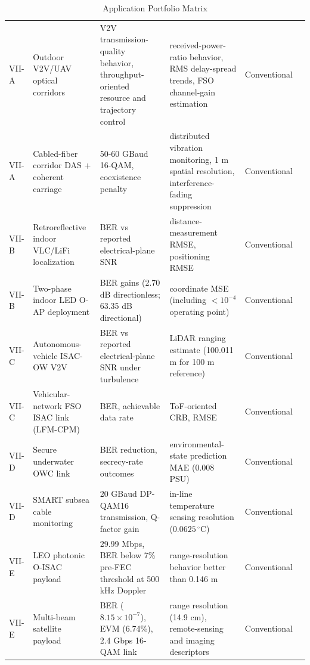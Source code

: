 \begin{table}[htbp]
\caption{Application Portfolio Matrix}
\label{tab:section7_portfolio}
\centering
\setlength{\tabcolsep}{3pt}
\renewcommand{\arraystretch}{1.12}
\begin{tabularx}{\textwidth}{@{}L{1.4cm}Y Y Y L{1.8cm}L{2.0cm}@{}}
\toprule
{} &  &  &  &  &  \\
\midrule
VII-A & Outdoor V2V/UAV optical corridors & V2V transmission-quality behavior, throughput-oriented resource and trajectory control & received-power-ratio behavior, RMS delay-spread trends, FSO channel-gain estimation & Conventional & \cite{O_ISAC_003,O_ISAC_005} \\
VII-A & Cabled-fiber corridor DAS + coherent carriage & 50-60 GBaud 16-QAM, coexistence penalty & distributed vibration monitoring, 1 m spatial resolution, interference-fading suppression & Conventional & \cite{O_ISAC_038,O_ISAC_074} \\
VII-B & Retroreflective indoor VLC/LiFi localization & BER vs reported electrical-plane SNR & distance-measurement RMSE, positioning RMSE & Conventional & \cite{O_ISAC_011} \\
VII-B & Two-phase indoor LED O-AP deployment & BER gains (2.70 dB directionless; 63.35 dB directional) & coordinate MSE (including $<10^{-4}$ operating point) & Conventional & \cite{O_ISAC_108} \\
VII-C & Autonomous-vehicle ISAC-OW V2V & BER vs reported electrical-plane SNR under turbulence & LiDAR ranging estimate (100.011 m for 100 m reference) & Conventional & \cite{O_ISAC_060} \\
VII-C & Vehicular-network FSO ISAC link (LFM-CPM) & BER, achievable data rate & ToF-oriented CRB, RMSE & Conventional & \cite{O_ISAC_055} \\
VII-D & Secure underwater OWC link & BER reduction, secrecy-rate outcomes & environmental-state prediction MAE (0.008 PSU) & Conventional & \cite{O_ISAC_127} \\
VII-D & SMART subsea cable monitoring & 20 GBaud DP-QAM16 transmission, Q-factor gain & in-line temperature sensing resolution ($0.0625\,^{\circ}\mathrm{C}$) & Conventional & \cite{O_ISAC_220} \\
VII-E & LEO photonic O-ISAC payload & 29.99 Mbps, BER below 7\% pre-FEC threshold at 500 kHz Doppler & range-resolution behavior better than 0.146 m & Conventional & \cite{O_ISAC_187} \\
VII-E & Multi-beam satellite payload & BER ($8.15 \times 10^{-7}$), EVM (6.74\%), 2.4 Gbps 16-QAM link & range resolution (14.9 cm), remote-sensing and imaging descriptors & Conventional & \cite{O_ISAC_195} \\
\bottomrule
\end{tabularx}
\end{table}

